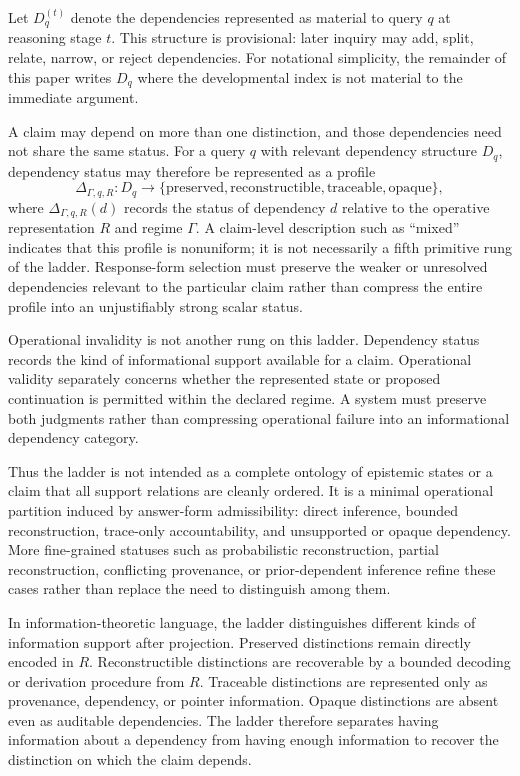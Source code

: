 \documentclass[11pt]{article}
\begin{document}
Let \(D_q^{(t)}\) denote the dependencies represented as material to query \(q\) at reasoning stage \(t\). This structure is provisional: later inquiry may add, split, relate, narrow, or reject dependencies. For notational simplicity, the remainder of this paper writes \(D_q\) where the developmental index is not material to the immediate argument.

A claim may depend on more than one distinction, and those dependencies need not share the same status. For a query \(q\) with relevant dependency structure \(D_q\), dependency status may therefore be represented as a profile
\[
\Delta_{\Gamma,q,R}:D_q
\rightarrow
\{\text{preserved},\text{reconstructible},
\text{traceable},\text{opaque}\},
\]
where \(\Delta_{\Gamma,q,R}(d)\) records the status of dependency \(d\) relative to the operative representation \(R\) and regime \(\Gamma\). A claim-level description such as ``mixed'' indicates that this profile is nonuniform; it is not necessarily a fifth primitive rung of the ladder. Response-form selection must preserve the weaker or unresolved dependencies relevant to the particular claim rather than compress the entire profile into an unjustifiably strong scalar status.

Operational invalidity is not another rung on this ladder. Dependency status records the kind of informational support available for a claim. Operational validity separately concerns whether the represented state or proposed continuation is permitted within the declared regime. A system must preserve both judgments rather than compressing operational failure into an informational dependency category.

Thus the ladder is not intended as a complete ontology of epistemic states or a claim that all support relations are cleanly ordered. It is a minimal operational partition induced by answer-form admissibility: direct inference, bounded reconstruction, trace-only accountability, and unsupported or opaque dependency. More fine-grained statuses such as probabilistic reconstruction, partial reconstruction, conflicting provenance, or prior-dependent inference refine these cases rather than replace the need to distinguish among them.

In information-theoretic language, the ladder distinguishes different kinds of information support after projection. Preserved distinctions remain directly encoded in $R$. Reconstructible distinctions are recoverable by a bounded decoding or derivation procedure from $R$. Traceable distinctions are represented only as provenance, dependency, or pointer information. Opaque distinctions are absent even as auditable dependencies. The ladder therefore separates having information about a dependency from having enough information to recover the distinction on which the claim depends.
\end{document}

